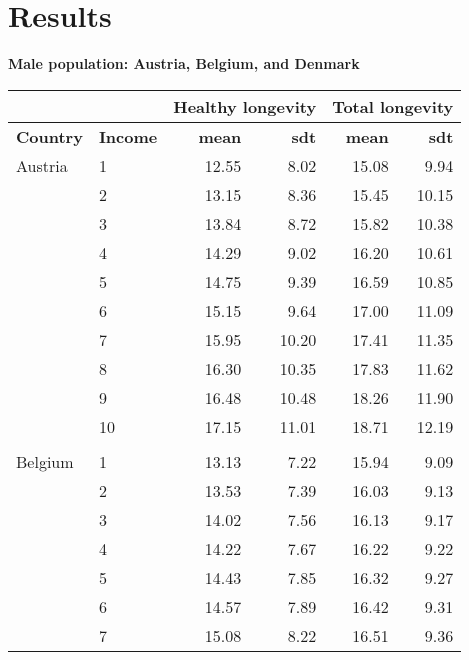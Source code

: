 







\chapter{Results}


\begin{table}
\centering \textbf{Male population: Austria, Belgium, and Denmark}\par\medskip\medskip
\begin{tabular}{llrrrr}
\toprule
& & \multicolumn{2}{l}{Healthy longevity} & \multicolumn{2}{l}{Total longevity} \\
\midrule
\textbf{Country }& \textbf{Income} &  \textbf{mean}       &  \textbf{sdt}     &     \textbf{mean}         & \textbf{sdt}    \\
\midrule
Austria & 1  &   12.55 &   8.02 &  15.08 &   9.94 \\
& 2  &   13.15 &   8.36 &  15.45 &  10.15 \\
& 3  &   13.84 &   8.72 &  15.82 &  10.38 \\
& 4  &   14.29 &   9.02 &  16.20 &  10.61 \\
 & 5  &   14.75 &   9.39 &  16.59 &  10.85 \\
& 6  &   15.15 &   9.64 &  17.00 &  11.09 \\
& 7  &   15.95 &  10.20 &  17.41 &  11.35 \\
& 8  &   16.30 &  10.35 &  17.83 &  11.62 \\
& 9  &   16.48 &  10.48 &  18.26 &  11.90 \\
 & 10 &   17.15 &  11.01 &  18.71 &  12.19 \\
               & &    &   &   &  \\
 Belgium & 1  &   13.13 &   7.22 &  15.94 &   9.09 \\
            & 2  &   13.53 &   7.39 &  16.03 &   9.13 \\
            & 3  &   14.02 &   7.56 &  16.13 &   9.17 \\
            & 4  &   14.22 &   7.67 &  16.22 &   9.22 \\
            & 5  &   14.43 &   7.85 &  16.32 &   9.27 \\
            & 6  &   14.57 &   7.89 &  16.42 &   9.31 \\
            & 7  &   15.08 &   8.22 &  16.51 &   9.36 \\

\end{tabular}
\end{table}
